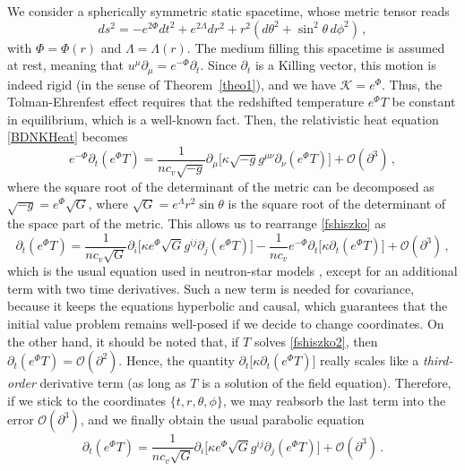\documentclass[a4paper, amsfonts, amssymb, amsmath, reprint, showkeys, nofootinbib, twoside, onecolumn,notitlepage]{revtex4-1}
\newcommand{\K}{{\mathcal{K}}}
\theoremstyle{definition}
\theoremstyle{theorem}
\begin{document}
We consider a spherically symmetric static spacetime, whose metric tensor reads
\begin{equation}
ds^2 =-e^{2\Phi} dt^2 +e^{2\Lambda} dr^2 + r^2 (d\theta^2 +\sin^2 \!\theta\, d\phi^2) \, ,
\end{equation}
with $\Phi=\Phi(r)$ and $\Lambda=\Lambda(r)$. The medium filling this spacetime is assumed at rest, meaning that $u^\mu \partial_\mu = e^{-\Phi} \partial_t$. Since $\partial_t$ is a Killing vector, this motion is indeed rigid (in the sense of Theorem~\ref{theo1}), and we have $\K =e^\Phi$. Thus, the Tolman-Ehrenfest effect requires that the redshifted temperature $e^\Phi T$ be constant in equilibrium, which is a well-known fact. Then, the relativistic heat equation \eqref{BDNKHeat} becomes
\begin{equation}\label{fshiszko}
e^{-\Phi} \partial_t (e^\Phi T) =\dfrac{1}{nc_v \sqrt{-g}} \partial_\mu \big[\kappa \sqrt{-g} g^{\mu \nu}\partial_\nu (e^\Phi T) \big] +\mathcal{O}(\partial^3) \, ,
\end{equation}
where the square root of the determinant of the metric can be decomposed as $\sqrt{-g}=e^{\Phi}\sqrt{G}$, where $\sqrt{G}=e^\Lambda r^2 \sin\theta$ is the square root of the determinant of the space part of the metric. 
This allows us to rearrange \eqref{fshiszko} as
\begin{equation}\label{fshiszko2}
\partial_t (e^\Phi T) =\dfrac{1}{nc_v \sqrt{G}} \partial_i \big[\kappa e^\Phi \sqrt{G} g^{ij}\partial_j (e^\Phi T) \big]-\dfrac{1}{nc_v} e^{-\Phi} \partial_t \big[\kappa \partial_t  (e^\Phi T) \big]+\mathcal{O}(\partial^3) \, ,
\end{equation}
which is the usual equation used in neutron-star models \cite{Yakovlev:2004iq,Potekhin:2015qsa,Lander:2018cvq,pons_vigano_review_2019}, except for an additional term with two time derivatives. Such a new term is needed for covariance, because it keeps the equations hyperbolic and causal, which guarantees that the initial value problem remains well-posed if we decide to change coordinates. On the other hand, it should be noted that, if $T$ solves \eqref{fshiszko2}, then $\partial_t (e^\Phi T) =\mathcal{O}(\partial^2)$. Hence, the quantity $\partial_t \big[\kappa \partial_t  (e^\Phi T) \big]$ really scales like a \textit{third-order} derivative term (as long as $T$ is a solution of the field equation). Therefore, if we stick to the coordinates $\{t,r,\theta,\phi \}$, we may reabsorb the last term into the error $\mathcal{O}(\partial^3)$, and we finally obtain the usual parabolic equation
\begin{equation}\label{fshiszko3}
\partial_t (e^\Phi T) =\dfrac{1}{nc_v \sqrt{G}} \partial_i \big[\kappa e^\Phi \sqrt{G} g^{ij}\partial_j (e^\Phi T) \big]+\mathcal{O}(\partial^3) \, .
\end{equation}
\end{document}
